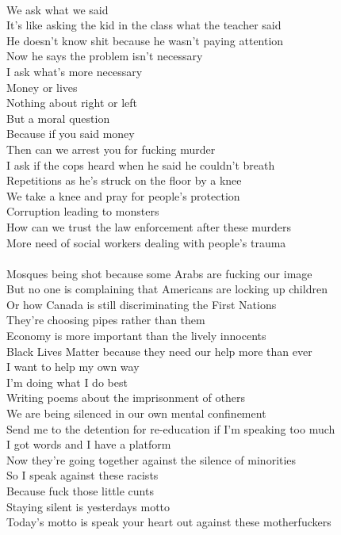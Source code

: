 \documentclass[12pt, b5paper, oneside]{book}
\begin{document}
\\We ask what we said 
\\It's like asking the kid in the class what the teacher said 
\\He doesn't know shit because he wasn't paying attention 
\\Now he says the problem isn't necessary 
\\I ask what's more necessary
\\Money or lives 
\\Nothing about right or left 
\\But a moral question 
\\Because if you said money 
\\Then can we arrest you for fucking murder 
\\I ask if the cops heard when he said he couldn't breath
\\Repetitions as he's struck on the floor by a knee
\\We take a knee and pray for people's protection 
\\Corruption leading to monsters 
\\How can we trust the law enforcement after these murders 
\\More need of social workers dealing with people's trauma 
%
\\\\Mosques being shot because some Arabs are fucking our image 
\\But no one is complaining that Americans are locking up children 
\\Or how Canada is still discriminating the First Nations 
\\They're choosing pipes rather than them 
\\Economy is more important than the lively innocents 
\\Black Lives Matter because they need our help more than ever 
\\I want to help my own way 
\\I'm doing what I do best
\\Writing poems about the imprisonment of others 
\\We are being silenced in our own mental confinement
\\Send me to the detention for re-education if I'm speaking too much
\\I got words and I have a platform 
\\Now they're going together against the silence of minorities
\\So I speak against these racists 
\\Because fuck those little cunts 
\\Staying silent is yesterdays motto 
\\Today's motto is speak your heart out against these motherfuckers
\newpage
\end{document}
